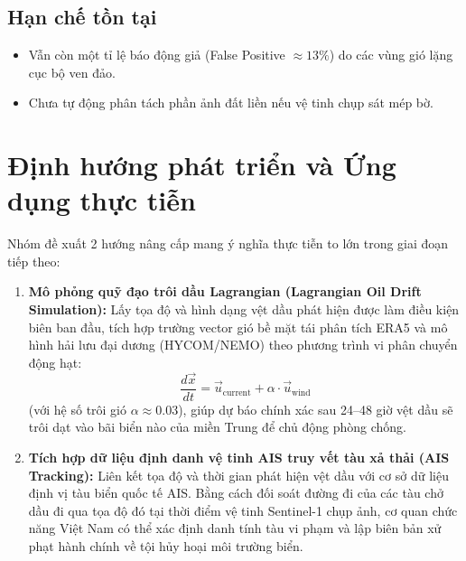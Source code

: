\subsection{Hạn chế tồn tại}
\begin{itemize}
    \item Vẫn còn một tỉ lệ báo động giả (False Positive $\approx 13\%$) do các vùng gió lặng cục bộ ven đảo.
    \item Chưa tự động phân tách phần ảnh đất liền nếu vệ tinh chụp sát mép bờ.

\end{itemize}

\section{Định hướng phát triển và Ứng dụng thực tiễn}
\label{sec:future_work}
Nhóm đề xuất 2 hướng nâng cấp mang ý nghĩa thực tiễn to lớn trong giai đoạn tiếp theo:
\begin{enumerate}
    \item \textbf{Mô phỏng quỹ đạo trôi dầu Lagrangian (Lagrangian Oil Drift Simulation):}
    Lấy tọa độ và hình dạng vệt dầu phát hiện được làm điều kiện biên ban đầu, tích hợp trường vector gió bề mặt tái phân tích ERA5 và mô hình hải lưu đại dương (HYCOM/NEMO) theo phương trình vi phân chuyển động hạt:
    \begin{equation}
        \frac{d\vec{x}}{dt} = \vec{u}_{\text{current}} + \alpha \cdot \vec{u}_{\text{wind}}
    \end{equation}
    (với hệ số trôi gió $\alpha \approx 0.03$), giúp dự báo chính xác sau 24--48 giờ vệt dầu sẽ trôi dạt vào bãi biển nào của miền Trung để chủ động phòng chống.
    \item \textbf{Tích hợp dữ liệu định danh vệ tinh AIS truy vết tàu xả thải (AIS Tracking):}
    Liên kết tọa độ và thời gian phát hiện vệt dầu với cơ sở dữ liệu định vị tàu biển quốc tế AIS. Bằng cách đối soát đường đi của các tàu chở dầu đi qua tọa độ đó tại thời điểm vệ tinh Sentinel-1 chụp ảnh, cơ quan chức năng Việt Nam có thể xác định danh tính tàu vi phạm và lập biên bản xử phạt hành chính về tội hủy hoại môi trường biển.
\end{enumerate}
